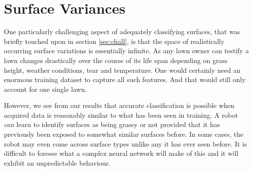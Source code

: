\section{Surface Variances}

One particularly challenging aspect of adequately classifying surfaces, that was briefly touched upon in section \ref{sec:chall}, is that the space of realistically occurring surface variations is essentially infinite. As any lawn owner can testify a lawn changes drastically over the course of its life span depending on grass height, weather conditions, tear and temperature. One would certainly need an enormous training dataset to capture all such features. And that would still only account for one single lawn. 

However, we see from our results that accurate classification is possible when acquired data is reasonably similar to what has been seen in training. A robot \emph{can} learn to identify surfaces as being grassy or not provided that it has previously been exposed to somewhat similar surfaces before. In some cases, the robot may even come across surface types unlike any it has ever seen before. It is difficult to foresee what a complex neural network will make of this and it will exhibit an unpredictable behaviour. 







